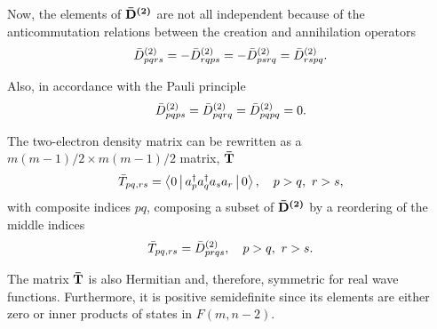 Now, the elements of $ \boldsymbol{\mathrm{\bar{D}^{\left( 2 \right)}}}$ are not all independent because of the
anticommutation relations between the creation and annihilation operators 
\begin{equation}
    \bar{D}^{\left( 2 \right)}_{pqrs} = - \bar{D}^{\left( 2 \right)}_{rqps} = - \bar{D}^{\left( 2 \right)}_{ps rq} = \bar{D}^{\left( 2 \right)}_{rspq}
    .
\end{equation}

Also, in accordance with the Pauli principle 
\begin{equation}
    \bar{D}^{\left( 2 \right)}_{pqps} = \bar{D}^{\left( 2 \right)}_{pqrq} = \bar{D}^{\left( 2 \right)}_{pqpq} = 0
    .
\end{equation}

The two-electron density matrix can be rewritten as a
$m\left( m-1 \right) /2 \times m\left( m-1 \right) /2$ 
matrix, $ \boldsymbol{\mathrm{\bar{T}}}$ 
\begin{equation}
    \bar{T}_{pq,rs} = \Braket{0 | a_p^{\dagger} a_q^{\dagger} a_s a_r | 0}
    , \quad
    p>q,\ r>s
    ,
\end{equation}
with composite indices $pq$, composing a subset of $ \boldsymbol{\mathrm{\bar{D}^{\left( 2 \right)}}}$ by a
reordering of the middle indices 
\begin{equation}
    \bar{T}_{pq,rs} = \bar{D}^{\left( 2 \right)}_{prqs}
    , \quad
    p>q,\ r>s
    .
\end{equation}

The matrix $ \boldsymbol{\mathrm{\bar{T}}}$ is also Hermitian and, therefore, symmetric for real
wave functions.
Furthermore, it is positive semidefinite since its elements are either zero
or inner products of states in $F\left( m, n-2 \right)$.

